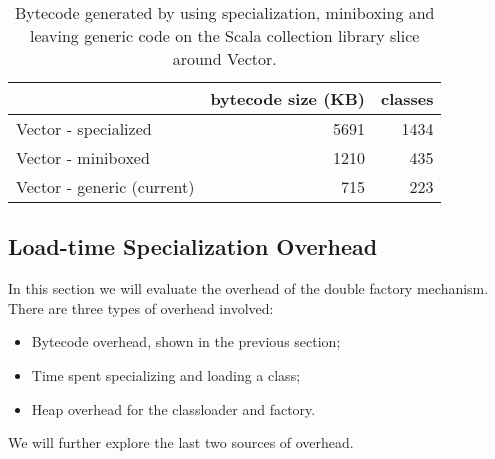 \begin{table}[b!]
\centering
\small
\begin{tabular}{l|r|r}
                               &  bytecode size (KB) & classes \\\hline 
Vector - specialized           &                5691 &    1434 \\
\rowcolor{Gray}
Vector - miniboxed             &                1210 &     435 \\
Vector - generic (current)     &                 715 &     223 \\
\end{tabular}
\caption{Bytecode generated by using specialization, miniboxing and leaving generic code on the Scala collection library slice around Vector.}
\label{tbl-results-bytecode-vector}
\end{table}

\subsection{Load-time Specialization Overhead}
\label{subsec-eval-specialization}

In this section we will evaluate the overhead of the double factory mechanism. There are three types of overhead involved:
\begin{itemize}
  \item Bytecode overhead, shown in the previous section;
  \item Time spent specializing and loading a class;
  \item Heap overhead for the classloader and factory.
\end{itemize}

We will further explore the last two sources of overhead.

